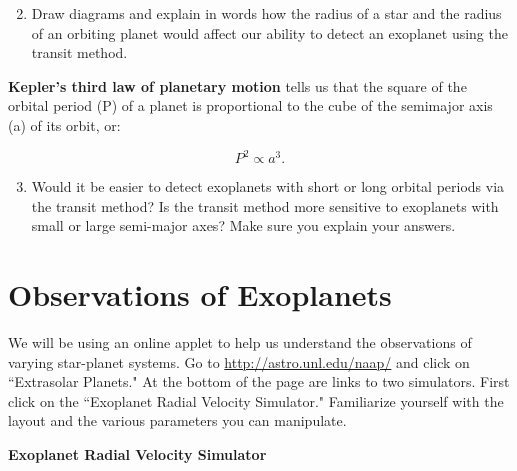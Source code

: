 \documentclass[11pt]{article}%
\begin{document}
\begin{enumerate}
\setcounter{enumi}{1}
\item Draw diagrams and explain in words how the radius of a star and the radius of an orbiting planet would affect our ability to detect an exoplanet using the transit method.
\end{enumerate}

\noindent \textbf{Kepler's third law of planetary motion} tells us that the square of the orbital period (P) of a planet is proportional to the cube of the semimajor axis (a) of its orbit, or:

\begin{equation}
P^2 \propto a^3.
\end{equation}

\begin{enumerate}
\setcounter{enumi}{2}
\item Would it be easier to detect exoplanets with short or long orbital periods via the transit method?  Is the transit method more sensitive to exoplanets with small or large semi-major axes?  Make sure you explain your answers.
\end{enumerate}

\section{Observations of Exoplanets} 

\noindent We will be using an online applet to help us understand the observations of varying star-planet systems.  Go to \url{http://astro.unl.edu/naap/} and click on ``Extrasolar Planets."  At the bottom of the page are links to two simulators.  First click on the ``Exoplanet Radial Velocity Simulator."  Familiarize yourself with the layout and the various parameters you can manipulate.

\vspace{0.1in}

\noindent \textbf{Exoplanet Radial Velocity Simulator}
\end{document}
